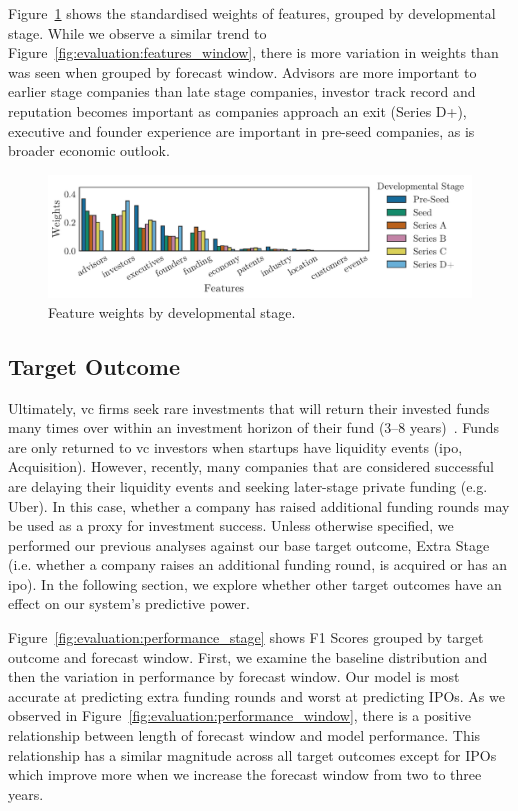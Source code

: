 \documentclass[../thesis/thesis.tex]{subfiles}
\begin{document}
Figure~\ref{fig:evaluation:features_stage} shows the standardised weights of features, grouped by developmental stage. While we observe a similar trend to Figure~\ref{fig:evaluation:features_window}, there is more variation in weights than was seen when grouped by forecast window. Advisors are more important to earlier stage companies than late stage companies, investor track record and reputation becomes important as companies approach an exit (Series D+), executive and founder experience are important in pre-seed companies, as is broader economic outlook.

\begin{figure}[!htb]
    \centering
    \includegraphics[width=\textwidth]{../figures/evaluation/features_stage}
    \caption[Feature weights by developmental stage]{Feature weights by developmental stage.}
    \label{fig:evaluation:features_stage}
\end{figure}

\subsection{Target Outcome}

Ultimately, \gls{vc} firms seek rare investments that will return their invested funds many times over within an investment horizon of their fund (3--8 years)~\cite{gompers1995}. Funds are only returned to \gls{vc} investors when startups have liquidity events (\gls{ipo}, Acquisition). However, recently, many companies that are considered successful are delaying their liquidity events and seeking later-stage private funding (e.g. Uber). In this case, whether a company has raised additional funding rounds may be used as a proxy for investment success. Unless otherwise specified, we performed our previous analyses against our base target outcome, Extra Stage (i.e. whether a company raises an additional funding round, is acquired or has an \gls{ipo}). In the following section, we explore whether other target outcomes have an effect on our system's predictive power.

Figure~\ref{fig:evaluation:performance_stage} shows F1 Scores grouped by target outcome and forecast window. First, we examine the baseline distribution and then the variation in performance by forecast window. Our model is most accurate at predicting extra funding rounds and worst at predicting IPOs. As we observed in Figure~\ref{fig:evaluation:performance_window}, there is a positive relationship between length of forecast window and model performance. This relationship has a similar magnitude across all target outcomes except for IPOs which improve more when we increase the forecast window from two to three years.
\end{document}
